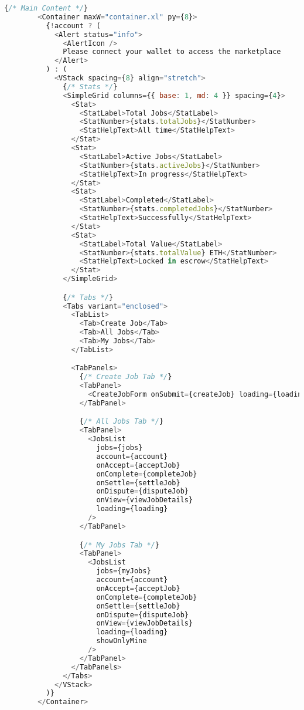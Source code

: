 \begin{lstlisting}[language=JavaScript,caption={App.jsx - Main React Application}]
        {/* Main Content */}
        <Container maxW="container.xl" py={8}>
          {!account ? (
            <Alert status="info">
              <AlertIcon />
              Please connect your wallet to access the marketplace
            </Alert>
          ) : (
            <VStack spacing={8} align="stretch">
              {/* Stats */}
              <SimpleGrid columns={{ base: 1, md: 4 }} spacing={4}>
                <Stat>
                  <StatLabel>Total Jobs</StatLabel>
                  <StatNumber>{stats.totalJobs}</StatNumber>
                  <StatHelpText>All time</StatHelpText>
                </Stat>
                <Stat>
                  <StatLabel>Active Jobs</StatLabel>
                  <StatNumber>{stats.activeJobs}</StatNumber>
                  <StatHelpText>In progress</StatHelpText>
                </Stat>
                <Stat>
                  <StatLabel>Completed</StatLabel>
                  <StatNumber>{stats.completedJobs}</StatNumber>
                  <StatHelpText>Successfully</StatHelpText>
                </Stat>
                <Stat>
                  <StatLabel>Total Value</StatLabel>
                  <StatNumber>{stats.totalValue} ETH</StatNumber>
                  <StatHelpText>Locked in escrow</StatHelpText>
                </Stat>
              </SimpleGrid>

              {/* Tabs */}
              <Tabs variant="enclosed">
                <TabList>
                  <Tab>Create Job</Tab>
                  <Tab>All Jobs</Tab>
                  <Tab>My Jobs</Tab>
                </TabList>

                <TabPanels>
                  {/* Create Job Tab */}
                  <TabPanel>
                    <CreateJobForm onSubmit={createJob} loading={loading} />
                  </TabPanel>

                  {/* All Jobs Tab */}
                  <TabPanel>
                    <JobsList 
                      jobs={jobs} 
                      account={account}
                      onAccept={acceptJob}
                      onComplete={completeJob}
                      onSettle={settleJob}
                      onDispute={disputeJob}
                      onView={viewJobDetails}
                      loading={loading}
                    />
                  </TabPanel>

                  {/* My Jobs Tab */}
                  <TabPanel>
                    <JobsList 
                      jobs={myJobs}
                      account={account}
                      onAccept={acceptJob}
                      onComplete={completeJob}
                      onSettle={settleJob}
                      onDispute={disputeJob}
                      onView={viewJobDetails}
                      loading={loading}
                      showOnlyMine
                    />
                  </TabPanel>
                </TabPanels>
              </Tabs>
            </VStack>
          )}
        </Container>


\end{lstlisting}
